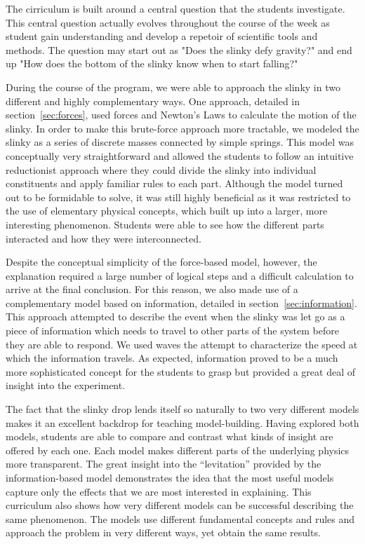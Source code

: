 \documentclass[aps,pre,10pt,superscriptaddress,showpacs,amsmath,amssymb,nofootinbib]{revtex4-1}
\renewcommand{\sec}[1]{section~\ref{sec:#1}}
\begin{document}
The cirriculum is built around a central question that the students investigate.
 This central question actually evolves throughout the course of the week as
student gain understanding and develop a repetoir of scientific tools and
methods.  The question may start out as "Does the slinky defy gravity?" and end
up  "How does the bottom of the slinky know when to start falling?"

During the course of the program, we were able to approach the slinky in two different
and highly complementary ways. One approach, detailed in \sec{forces}, used forces and Newton's Laws to calculate
the motion of the slinky. In order to make this brute-force approach more tractable, we
modeled the slinky as a series of discrete masses connected by simple springs. This
model was conceptually very straightforward and allowed the students to follow an
intuitive reductionist approach where they could divide the slinky into individual
constituents and apply familiar rules to each part. Although the model turned out to
be formidable to solve, it was still highly beneficial as it was restricted to the
use of elementary physical concepts, which built up into a larger, more interesting
phenomenon. Students were able to see how the different parts interacted and how they
were interconnected.

Despite the conceptual simplicity of the force-based model, however, the explanation
required a large number of logical steps and a difficult calculation to arrive at
the final conclusion. For this reason, we also made use of a complementary
model based on information, detailed in \sec{information}. This approach attempted
to describe the event when the slinky was let go as a piece of information which
needs to travel to other parts of the system before they are able to respond. We
used waves the attempt to characterize the speed at which the information travels. 
As expected, information proved to be a much more sophisticated concept for the
students to grasp but provided a great deal of insight into the experiment.

The fact that the slinky drop lends itself so naturally to two very different models
makes it an excellent backdrop for teaching model-building. Having explored both
models, students are able to compare and contrast what kinds of insight are
offered by each one. Each model makes different parts of the underlying physics
more transparent. The great insight into the ``levitation'' provided by the
information-based model demonstrates the idea that the most useful models
capture only the effects that we are most interested in explaining. This curriculum
also shows how very different models can be successful describing the same
phenomenon. The models use different fundamental concepts and rules and approach
the problem in very different ways, yet obtain the same results. 
\end{document}
